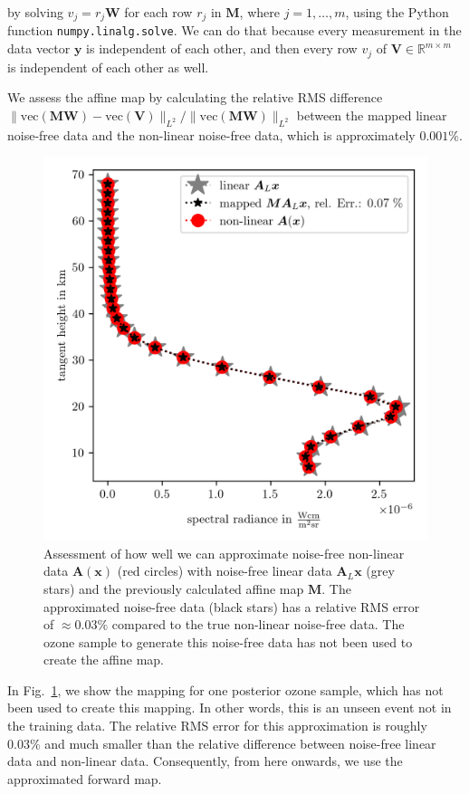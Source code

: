 by solving $v_j =r_j \bm{W}$ for each row $r_j$ in $\bm{M}$, where $j = 1, \dots, m$, using the Python function \texttt{numpy.linalg.solve}.
We can do that because every measurement in the data vector $\bm{y}$ is independent of each other, and then every row $v_j$ of $\bm{V} \in \mathbb{R}^{m \times m}$ is independent of each other as well.

We assess the affine map by calculating the relative RMS difference $\lVert \text{vec}(\bm{M}\bm{W}) - \text{vec}(\bm{V})  \rVert_{L^2} / \lVert \text{vec}(\bm{M}\bm{W}) \rVert_{L^2} $ between the mapped linear noise-free data and the non-linear noise-free data, which is approximately $0.001\%$.
\begin{figure}[t!]
	\centering
	\includegraphics{SampMapAssesmentTT.png}
	\caption[Assessment of affine map.]{Assessment of how well we can approximate noise-free non-linear data $\bm{A}(\bm{x})$  (red circles) with noise-free linear data $\bm{A}_L\bm{x}$ (grey stars) and the previously calculated affine map $\bm{M}$. The approximated noise-free data (black stars) has a relative RMS error of $\approx 0.03\%$ compared to the true non-linear noise-free data.
	The ozone sample to generate this noise-free data has not been used to create the affine map.}
	\label{fig:MapAsses}
\end{figure}
In Fig.~\ref{fig:MapAsses}, we show the mapping for one posterior ozone sample, which has not been used to create this mapping.
In other words, this is an unseen event not in the training data.
The relative RMS error for this approximation is roughly $0.03\%$ and much smaller than the relative difference between noise-free linear data and non-linear data.
Consequently, from here onwards, we use the approximated forward map.
\clearpage

